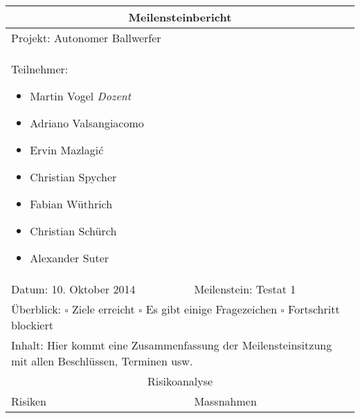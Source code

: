 \begin{table}[!h]
	\renewcommand{\arraystretch}{1.5}
	\begin{tabularx}{\linewidth}{|X|X|}
		\hline
		\multicolumn{2}{|c|}{
			\parbox[0pt][3em][c]{0cm}{}
			{\large \textbf{Meilensteinbericht}}
		} \\
		\hline
		\multicolumn{2}{|l|}{Projekt: Autonomer Ballwerfer} \\
		\hline
		\multicolumn{2}{|X|}{
			Teilnehmer:
			\begin{itemize}
				\setlength\itemsep{0em}
				\item Martin Vogel \textit{Dozent}
				\item Adriano Valsangiacomo
				\item Ervin Mazlagi\'c
				\item Christian Spycher
				\item Fabian Wüthrich
				\item Christian Schürch
				\item Alexander Suter
			\end{itemize}
		} \\
		\hline
		Datum: 10. Oktober 2014 & Meilenstein: Testat 1 \\
		\hline
		\multicolumn{2}{|X|}{
			Überblick: \newline
			$\square$ Ziele erreicht \newline 
			$\square$ Es gibt einige Fragezeichen \newline
			$\square$ Fortschritt blockiert
		} \\
		\hline
		\multicolumn{2}{|X|}{
			Inhalt: \newline
			Hier kommt eine Zusammenfassung der Meilensteinsitzung mit allen Beschlüssen, Terminen usw.	
		} \\
		\hline
		\multicolumn{2}{|c|}{Risikoanalyse} \\
		\hline
		Risiken & Massnahmen \\
		\hline
	\end{tabularx}
\end{table}